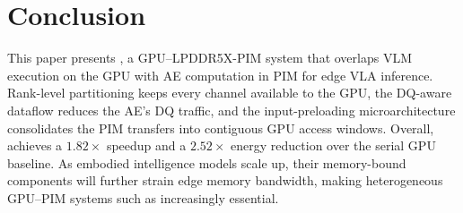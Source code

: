 
\section{Conclusion}
\label{sec:conclusion}

This paper presents \sys{}, a GPU--LPDDR5X-PIM system that overlaps VLM execution on the GPU with AE computation in PIM for edge VLA inference. Rank-level partitioning keeps every channel available to the GPU, the DQ-aware dataflow reduces the AE's DQ traffic, and the input-preloading microarchitecture consolidates the PIM transfers into contiguous GPU access windows. Overall, \sys{} achieves a $1.82\times$ speedup and a $2.52\times$ energy reduction over the serial GPU baseline. As embodied intelligence models scale up, their memory-bound components will further strain edge memory bandwidth, making heterogeneous GPU--PIM systems such as \sys{} increasingly essential.
